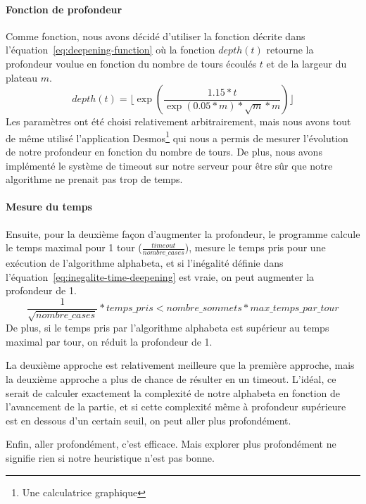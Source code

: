 \paragraph{Fonction de profondeur}
Comme fonction, nous avons décidé d'utiliser la fonction décrite dans l'équation~\ref{eq:deepening-function} où la fonction
$depth(t)$ retourne la profondeur voulue en fonction du nombre de tours écoulés $t$ et de la largeur du plateau $m$.
\begin{equation}
	depth(t) = \lfloor\exp\left(\frac{1.15*t}{\exp(0.05*m)*\sqrt{m}*m}\right)\rfloor
	\label{eq:deepening-function}
\end{equation}
Les paramètres ont été choisi relativement arbitrairement, mais nous avons tout de même
utilisé l'application Desmos\footnote{Une calculatrice graphique} qui nous a permis de mesurer
l'évolution de notre profondeur en fonction du nombre de tours. De plus, nous avons implémenté
le système de timeout sur notre serveur pour être sûr que notre algorithme ne prenait pas trop de temps.

\paragraph{Mesure du temps}
Ensuite, pour la deuxième façon d'augmenter la profondeur, le programme calcule
le temps maximal pour 1 tour ($\frac{timeout}{nombre\_cases}$),
mesure le temps pris pour une exécution de l'algorithme alphabeta, et
si l'inégalité définie dans l'équation~\ref{eq:inegalite-time-deepening} est vraie,
on peut augmenter la profondeur de 1.
\begin{equation}
	\frac{1}{\sqrt{nombre\_cases}}*temps\_pris < nombre\_sommets*max\_temps\_par\_tour
	\label{eq:inegalite-time-deepening}
\end{equation}
De plus, si le temps pris par l'algorithme alphabeta est supérieur au temps maximal par tour,
on réduit la profondeur de 1.

La deuxième approche est relativement meilleure que la première approche, mais la deuxième approche a plus
de chance de résulter en un timeout. L'idéal, ce serait de calculer exactement la complexité de notre alphabeta en fonction
de l'avancement de la partie, et si cette complexité même à profondeur supérieure est en dessous d'un certain seuil, on peut
aller plus profondément.

Enfin, aller profondément, c'est efficace. Mais explorer plus profondément
ne signifie rien si notre heuristique n'est pas bonne.

